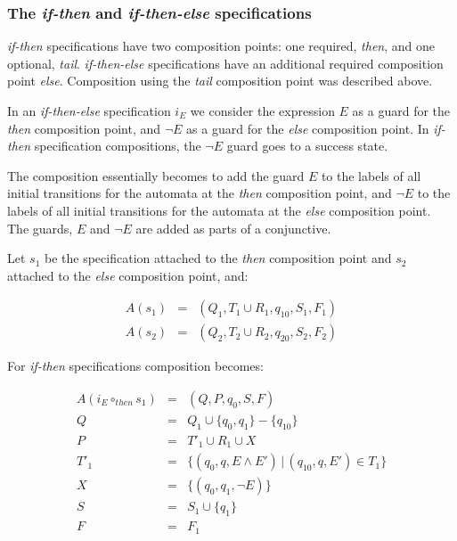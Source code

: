 \subsubsection{The \textit{if-then} and \textit{if-then-else} specifications}

\textit{if-then} specifications have two composition points: one required,
\textit{then}, and one optional, \textit{tail}. \textit{if-then-else}
specifications have an additional required composition point \textit{else}.
Composition using the \textit{tail} composition point was described above.

In an \textit{if-then-else} specification $i_E$ we consider the expression $E$
as a guard for the \textit{then} composition point, and $\neg E$ as a guard
for the \textit{else} composition point. In \textit{if-then} specification
compositions, the $\neg E$ guard goes to a success state.

The composition essentially becomes to add the guard $E$ to the labels of all
initial transitions for the automata at the \textit{then} composition point,
and $\neg E$ to the labels of all initial transitions for the automata at the
\textit{else} composition point. The guards, $E$ and $\neg E$ are added as
parts of a conjunctive.

Let $s_1$ be the specification attached to the \textit{then} composition point
and $s_2$ attached to the \textit{else} composition point, and:

\medskip
\[
  \begin{array}{rcl}
    A(s_1) & = & (Q_1, T_1 \cup R_1, q_{10}, S_1, F_1) \\
    A(s_2) & = & (Q_2, T_2 \cup R_2, q_{20}, S_2, F_2)
  \end{array}
\]
\medskip

For \textit{if-then} specifications composition becomes:

\medskip
\[
  \begin{array}{rcl}
  A(i_E \circ_{then} s_1) & = & (Q, P, q_0, S, F) \\
                        Q & = & Q_1 \cup \{q_0, q_1\} - \{q_{10}\} \\
                        P & = & T'_1 \cup R_1 \cup X \\
                     T'_1 & = & \{(q_0, q, E       \wedge E') \, | \, (q_{10}, q, E') \in T_1\} \\
                        X & = & \{(q_0, q_1, \neg E)\} \\
                        S & = & S_1 \cup \{q_1\} \\
                        F & = & F_1
  \end{array}
\]
\medskip

